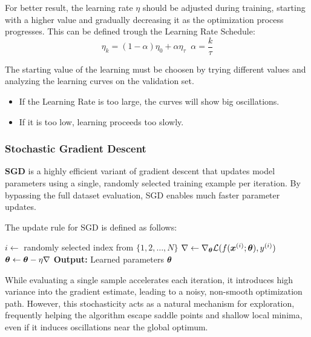 {
    For better result, the learning rate $\eta$ should be adjusted during training, starting with a higher
    value and gradually decreasing it as the optimization process progresses.
    This can be defined trough the Learning Rate Schedule:
    \begin{equation*}
        \eta_k = (1 - \alpha)\eta_0 + \alpha \eta_{\tau}\;\;\alpha = \frac{k}{\tau}
    \end{equation*}

    The starting value of the learning must be choosen by trying different values and analyzing the
    learning curves on the validation set.
    \begin{itemize}
        \item If the Learning Rate is too large, the curves will show big oscillations.
        \item If it is too low, learning proceeds too slowly.
    \end{itemize}
}


\subsubsection{Stochastic Gradient Descent}
\textbf{SGD} is a highly efficient variant of gradient descent that updates model parameters using a single, randomly selected training example per iteration. By bypassing the full dataset evaluation, SGD enables much faster parameter updates.

The update rule for SGD is defined as follows:
\begin{algorithm}[H]
    \caption{Stochastic Gradient Descent}
    \begin{algorithmic}[1]
            \State $i \leftarrow$ randomly selected index from $\{1, 2, \ldots, N\}$
            \State $\nabla \leftarrow \nabla_{\boldsymbol{\theta}} \mathcal{L}(f(\boldsymbol{x}^{(i)}; \boldsymbol{\theta}), y^{(i)})$
            \State $\boldsymbol{\theta} \leftarrow \boldsymbol{\theta} - \eta \nabla$
        \EndWhile
        \State \textbf{Output:} Learned parameters $\boldsymbol{\theta}$
    \end{algorithmic}
\end{algorithm}
While evaluating a single sample accelerates each iteration, it introduces high variance into the gradient estimate, leading to a noisy, non-smooth optimization path. However, this stochasticity acts as a natural mechanism for exploration, frequently helping the algorithm escape saddle points and shallow local minima, even if it induces oscillations near the global optimum.

